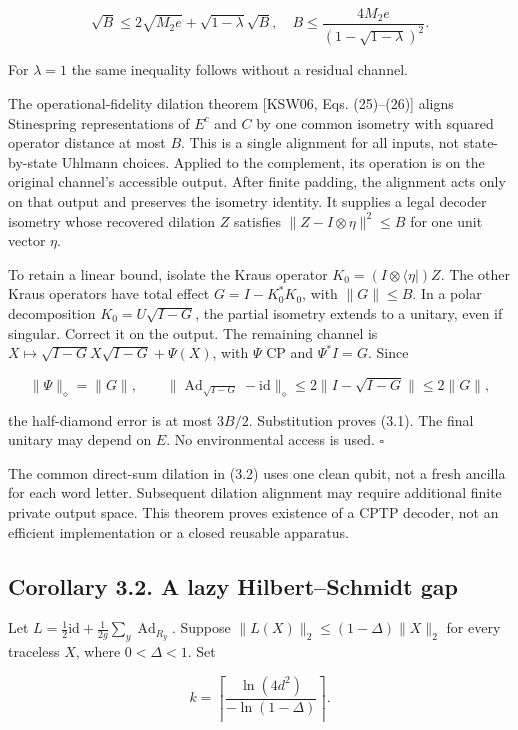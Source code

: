 \documentclass[11pt]{article}
\begin{document}
\[
\sqrt B\le2\sqrt{M_2e}+\sqrt{1-\lambda}\sqrt B,
\quad
B\le\frac{4M_2e}{(1-\sqrt{1-\lambda})^2}.
\tag{3.5}
\]

For \(\lambda=1\) the same inequality follows without a residual channel.

The operational-fidelity dilation theorem [KSW06, Eqs. (25)--(26)] aligns
Stinespring representations of \(E^c\) and \(C\) by one common isometry with
squared operator distance at most \(B\). This is a single alignment for all
inputs, not state-by-state Uhlmann choices. Applied to the complement, its
operation is on the original channel's accessible output. After finite
padding, the alignment acts only on that output and preserves the isometry
identity. It supplies a legal decoder isometry whose recovered dilation \(Z\)
satisfies \(\|Z-I\otimes\eta\|^2\le B\) for one unit vector \(\eta\).

To retain a linear bound, isolate the Kraus operator
\(K_0=(I\otimes\langle\eta|)Z\). The other Kraus operators have total
effect \(G=I-K_0^*K_0\), with \(\|G\|\le B\). In a polar decomposition
\(K_0=U\sqrt{I-G}\), the partial isometry extends to a unitary, even if
singular. Correct it on the output. The remaining channel is
\(X\mapsto\sqrt{I-G}X\sqrt{I-G}+\Psi(X)\), with \(\Psi\) CP and
\(\Psi^*I=G\). Since

\[
\|\Psi\|_\diamond=\|G\|,\qquad
\|\operatorname{Ad}_{\sqrt{I-G}}-\mathrm{id}\|_\diamond
\le2\|I-\sqrt{I-G}\|\le2\|G\|,
\]

the half-diamond error is at most \(3B/2\). Substitution proves (3.1).
The final unitary may depend on \(E\). No environmental access is used. \hfill\(\square\)

The common direct-sum dilation in (3.2) uses one clean qubit, not a fresh
ancilla for each word letter. Subsequent dilation alignment may require
additional finite private output space. This theorem proves existence of a
CPTP decoder, not an efficient implementation or a closed reusable apparatus.

\subsection*{Corollary 3.2. A lazy Hilbert--Schmidt gap}

Let \(L=\tfrac12\mathrm{id}+\tfrac1{2g}\sum_y\operatorname{Ad}_{R_y}\).
Suppose \(\|L(X)\|_2\le(1-\Delta)\|X\|_2\) for every traceless \(X\),
where \(0<\Delta<1\). Set

\[
k=\left\lceil\frac{\ln(4d^2)}{-\ln(1-\Delta)}\right\rceil.
\]
\end{document}
